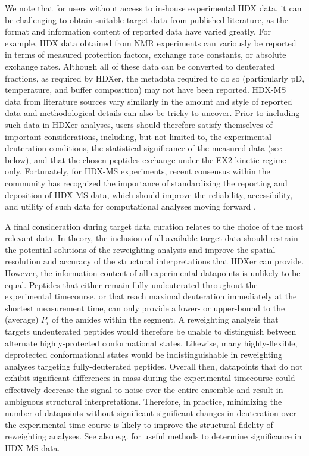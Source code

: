 \documentclass[9pt,tutorial,ASAPversion]{livecoms}
\begin{document}
We note that for users without access to in-house experimental HDX data, it can be challenging to obtain suitable target data from published literature, as the format and information content of reported data have varied greatly.
For example, HDX data obtained from NMR experiments can variously be reported in terms of measured protection factors, exchange rate constants, or absolute exchange rates.
Although all of these data can be converted to deuterated fractions, as required by HDXer, the metadata required to do so (particularly pD, temperature, and buffer composition) may not have been reported.
HDX-MS data from literature sources vary similarly in the amount and style of reported data and methodological details can also be tricky to uncover.
Prior to including such data in HDXer analyses, users should therefore satisfy themselves of important considerations, including, but not limited to, the experimental deuteration conditions, the statistical significance of the measured data (see below), and that the chosen peptides exchange under the EX2 kinetic regime only.
Fortunately, for HDX-MS experiments, recent consensus within the community has recognized the importance of standardizing the reporting and deposition of HDX-MS data, which should improve the reliability, accessibility, and utility of such data for computational analyses moving forward \cite{Masson2019}.

A final consideration during target data curation relates to the choice of the most relevant data. 
In theory, the inclusion of all available target data should restrain the potential solutions of the reweighting analysis and improve the spatial resolution and accuracy of the structural interpretations that HDXer can provide.
However, the information content of all experimental datapoints is unlikely to be equal.
Peptides that either remain fully undeuterated throughout the experimental timecourse, or that reach maximal deuteration immediately at the shortest measurement time, can only provide a lower- or upper-bound to the (average) $P_i$ of the amides within the segment.
A reweighting analysis that targets undeuterated peptides would therefore be unable to distinguish between alternate highly-protected conformational states.
Likewise, many highly-flexible, deprotected conformational states would be indistinguishable in reweighting analyses targeting fully-deuterated peptides.
Overall then, datapoints that do not exhibit significant differences in mass during the experimental timecourse could effectively decrease the signal-to-noise over the entire ensemble and result in ambiguous structural interpretations.
Therefore, in practice, minimizing the number of datapoints without significant significant changes in deuteration over the experimental time course is likely to improve the structural fidelity of reweighting analyses. 
See also e.g. \cite{Hageman2019, Weis2021} for useful methods to determine significance in HDX-MS data.
\end{document}
